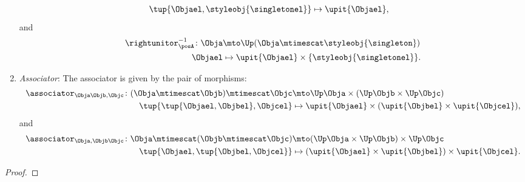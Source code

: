 \begin{lemma}
\begin{enumerate}
\begin{equation}
\begin{aligned}
            \tup{\Objael,\styleobj{\singletonel}}&\mapsto \upit\{\Objael\},
        \end{aligned}
    \end{equation}
    and
    \begin{equation}
        \begin{aligned}
            \rightunitor_\posA^{-1}\colon \Obja &\mto \Up( \Obja \mtimescat \styleobj{\singleton}) \\
            \Objael&\mapsto \upit \{\Objael\} \times \{\styleobj{\singletonel}\}.
        \end{aligned}
    \end{equation}
    \item \emph{Associator}: The associator is given by the pair of morphisms:
    \begin{equation}
        \begin{aligned}
            \associator_{\Obja\Objb,\Objc}\colon (\Obja\mtimescat \Objb)\mtimescat \Objc &\mto \Up \Obja\times (\Up \Objb \times \Up \Objc)\\
            \tup{\tup{\Objael,\Objbel},\Objcel}&\mapsto \upit\{\Objael\}\times (\upit\{\Objbel\}\times \upit\{\Objcel\}),
        \end{aligned}
    \end{equation}
    and
    \begin{equation}
        \begin{aligned}
            \associator_{\Obja,\Objb\Objc}\colon \Obja\mtimescat (\Objb\mtimescat \Objc) &\mto (\Up \Obja\times \Up \Objb) \times \Up \Objc\\
            \tup{\Objael,\tup{\Objbel,\Objcel}}&\mapsto (\upit\{\Objael\}\times \upit\{\Objbel\})\times \upit\{\Objcel\}.
        \end{aligned}
    \end{equation}
\end{enumerate}
\end{lemma}
\begin{proof}
\end{proof}

